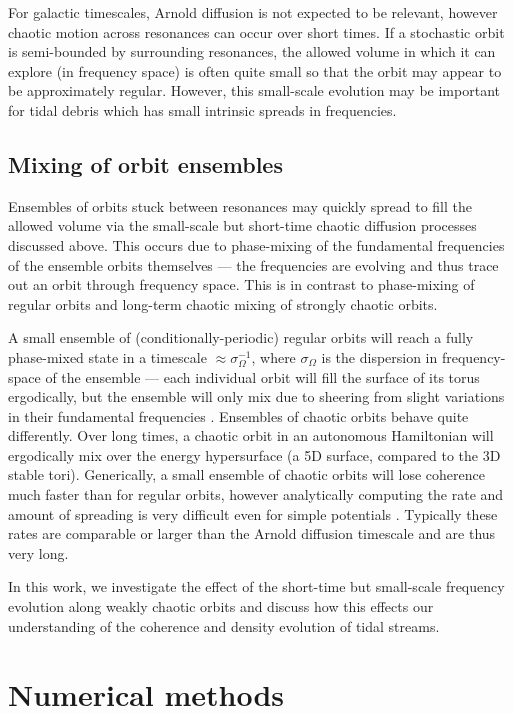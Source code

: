 \documentclass[letterpaper,12pt,preprint]{aastex}
\begin{document}
For galactic timescales, Arnold diffusion is not expected to be relevant, however chaotic motion across resonances can occur over short times. If a stochastic orbit is semi-bounded by surrounding resonances, the allowed volume in which it can explore (in frequency space) is often quite small so that the orbit may appear to be approximately regular. However, this small-scale evolution may be important for tidal debris which has small intrinsic spreads in frequencies.

\subsection{Mixing of orbit ensembles}

Ensembles of orbits stuck between resonances may quickly spread to fill the allowed volume via the small-scale but short-time chaotic diffusion processes discussed above. This occurs due to phase-mixing of the fundamental frequencies of the ensemble orbits themselves --- the frequencies are evolving and thus trace out an orbit through frequency space. This is in contrast to phase-mixing of regular orbits and long-term chaotic mixing of strongly chaotic orbits.

A small ensemble of (conditionally-periodic) regular orbits will reach a fully phase-mixed state in a timescale  $\approx\sigma_\Omega^{-1}$, where $\sigma_\Omega$ is the dispersion in frequency-space of the ensemble --- each individual orbit will fill the surface of its torus ergodically, but the ensemble will only mix due to sheering from slight variations in their fundamental frequencies \citep{merritt96, helmi99}. Ensembles of chaotic orbits behave quite differently. Over long times, a chaotic orbit in an autonomous Hamiltonian will ergodically mix over the energy hypersurface (a 5D surface, compared to the 3D stable tori). Generically, a small ensemble of chaotic orbits will lose coherence much faster than for regular orbits, however analytically computing the rate and amount of spreading is very difficult even for simple potentials \cite[see, e.g.,][]{chirikov??}. Typically these rates are comparable or larger than the Arnold diffusion timescale and are thus very long.

In this work, we investigate the effect of the short-time but small-scale frequency evolution along weakly chaotic orbits and discuss how this effects our understanding of the coherence and density evolution of tidal streams.

\section{Numerical methods}\label{sec:methods}
\end{document}
